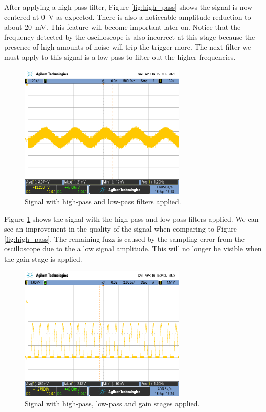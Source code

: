 \documentclass[CMPE]{../KGCOEReport}
\begin{document}
	\pagebreak

	After applying a high pass filter, Figure \ref{fig:high_pass} shows the signal is
	now centered at
	\SI{0}{\volt} as expected. There is also a noticeable amplitude reduction to about
	\SI{20}{\milli\volt}. This feature will become important later on. Notice that the
	frequency detected by the oscilloscope is also incorrect at this stage because the
	presence of high amounts of noise will trip the trigger more. The next filter
	we must apply to this signal is a low pass to filter out the higher frequencies.

	\begin{figure}[h!]
        \centering
        \includegraphics[width=8cm]{scope_3}
        \caption{Signal with high-pass and low-pass filters applied.}
        \label{fig:low_pass}
	\end{figure}

	Figure \ref{fig:low_pass} shows the signal with the high-pass and low-pass filters
	applied. We can see an improvement in the quality of the signal when comparing
	to Figure \ref{fig:high_pass}. The remaining fuzz is caused by the sampling error
	from the oscilloscope due to the a low signal amplitude. This will no longer be visible
	when the gain stage is applied.

	\pagebreak

	\begin{figure}[h!]
        \centering
        \includegraphics[width=8cm]{scope_4}
        \caption{Signal with high-pass, low-pass and gain stages applied.}
        \label{fig:gain}
	\end{figure}
\end{document}
